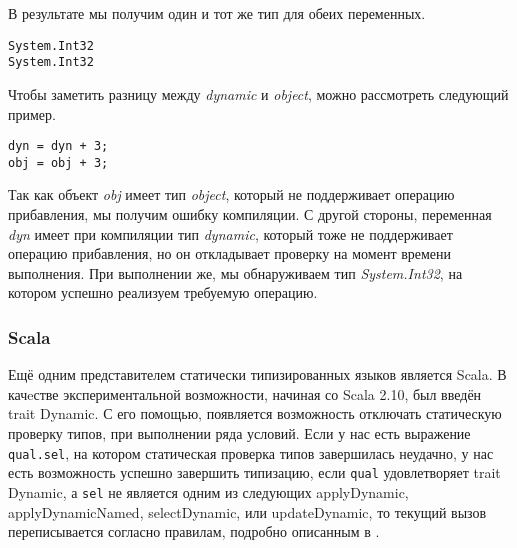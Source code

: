 В результате мы получим один и тот же тип для обеих переменных.
\begin{verbatim}
System.Int32
System.Int32
\end{verbatim}
    Чтобы заметить разницу между \textit{dynamic} и \textit{object}, можно рассмотреть следующий пример.

\begin{verbatim}
dyn = dyn + 3;  
obj = obj + 3;  
\end{verbatim}

Так как объект \textit{obj} имеет тип \textit{object}, который не поддерживает операцию прибавления, мы получим ошибку компиляции. С другой стороны, переменная \textit{dyn} имеет при компиляции тип \textit{dynamic}, который тоже не поддерживает операцию прибавления, но он откладывает проверку на момент времени выполнения. При выполнении же, мы обнаруживаем тип \textit{System.Int32}, на котором успешно реализуем требуемую операцию.

\subsubsection{Scala}

Ещё одним представителем статически типизированных языков является Scala. В качeстве экспериментальной возможности, начиная со Scala 2.10, был введён trait Dynamic. С его помощью, появляется возможность отключать статическую проверку типов, при выполнении ряда условий. Если у нас есть выражение \texttt{qual.sel}, на котором статическая проверка типов завершилась неудачно, у нас есть возможность успешно завершить типизацию, если \texttt{qual} удовлетворяет trait Dynamic, а \texttt{sel} не является одним из следующих applyDynamic, applyDynamicNamed, selectDynamic, или updateDynamic, то текущий вызов переписывается согласно правилам, подробно описанным в \cite{scala:sipDynamicProposal}.



